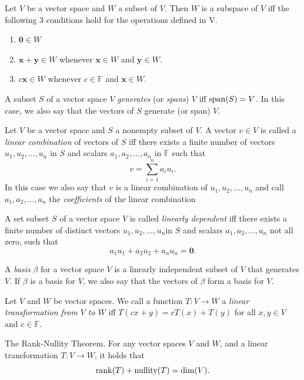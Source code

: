 \documentclass[../Notes.tex]{subfiles}
\begin{document}
\begin{theorem}{}{}
    Let \(V\) be a vector space and \(W\) a subset of \(V\). Then \(W\) is a subspace of \(V\) iff the following 3 conditions hold for the operations defined in V.
            \begin{enumerate}[label=(\alph*)]
                \item \(\mathbf{0} \in W\) \label{Theorem 1.3(a)}
                \item \(\mathbf{x}+\mathbf{y} \in W\) whenever \(\mathbf{x} \in W\) and \(\mathbf{y} \in W\). \label{Theorem 1.3(b)}
                \item \(c\mathbf{x} \in W\) whenever \(c \in \mathbb{F}\) and \(\mathbf{x} \in W\). \label{Theorem 1.3(c)}
            \end{enumerate}
\end{theorem}
\begin{definition}{}{}
    A subset \(S\) of a vector space \(V\) \emph{generates} (or \emph{spans}) \(V\) iff \(\operatorname{span}(S)=V\). In this case, we also say that the vectors of \(S\) generate (or span) \(V\).
\end{definition}
\begin{definition}{}{}
    Let \(V\) be a vector space and \(S\) a nonempty subset of \(V\). A vector \(v \in V\) is called a \emph{linear combination} of vectors of \(S\) iff there exists a finite number of vectors \(u_1,u_2,\dots,u_n\) in \(S\) and scalars \(a_1,a_2,\dots,a_n\) in \(\mathbb{F}\) such that
            \[v=\sum_{i=1}^{n}{a_iu_i}.\]
            In this case we also say that \(v\) is a linear combination of \(u_1,u_2,\dots,u_n\) and call \(a_1,a_2,\dots,a_n\) the \emph{coefficients} of the linear combination
\end{definition}
\begin{definition}{}{}
    A set subset \(S\) of a vector space \(V\) is called \emph{linearly dependent} iff there exists a finite number of distinct vectors \(u_1,u_2,\dots,u_n\)in \(S\) and scalars \(a_1,a_2,\dots,a_n\) not all zero, such that
            \[a_1u_1+a_2u_2+a_nu_n=\mathbf{0}.\]
\end{definition}
\begin{definition}{}{}
    A \emph{basis} \(\beta\) for a vector space \(V\) is a linearly independent subset of \(V\) that generates \(V\). If \(\beta\) is a basis for \(V\), we also say that the vectors of \(\beta\) form a basis for \(V\).
\end{definition}
\begin{definition}{}{}
    Let \(V\) and \(W\) be vector spaces. We call a function \(T\colon V\to W\) a \emph{linear transformation from \(V\) to \(W\)} iff \(T(cx+y)=cT(x)+T(y)\) for all \(x,y\in V\) and \(c\in \mathbb{F}\).
\end{definition}
\begin{theorem}{The Rank-Nullity Theorem.}{}
    For any vector spaces \(V\) and \(W\), and a linear transformation \(T \colon V \to W\), it holds that
    \[\operatorname{rank}(T)+\operatorname{nullity}(T)=\dim(V).\]
\end{theorem}
\end{document}
